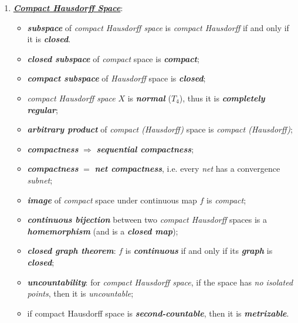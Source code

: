 \documentclass[11pt]{article}
\begin{document}
\begin{remark}
\begin{enumerate}
\item \underline{\emph{\textbf{Compact Hausdorff Space}}}:
\begin{itemize}
\item \emph{\textbf{subspace}} of \emph{compact Hausdorff space} is \emph{compact Hausdorff} if and only if it is \emph{\textbf{closed}}. 
\item \emph{\textbf{closed subspace}} of \emph{compact} space is \emph{\textbf{compact}}; 
\item \emph{\textbf{compact subspace}} of \emph{Hausdorff} space is \emph{\textbf{closed}};
\item \emph{compact Hausdorff space} $X$ is \textbf{\emph{normal}} ($T_4$), thus it is \emph{\textbf{completely regular}};
\item \emph{\textbf{arbitrary product}} of \emph{compact (Hausdorff)}  space is \emph{compact (Hausdorff)};
\item \emph{\textbf{compactness}} $\Rightarrow$ \emph{\textbf{sequential compactness}};
\item  \emph{\textbf{compactness}} $=$ \emph{\textbf{net compactness}}, i.e. every \emph{net} has a convergence \emph{subnet};
\item \emph{\textbf{image}} of \emph{compact} space under continuous map $f$ is \emph{compact};
\item \emph{\textbf{continuous bijection}} between two \emph{compact Hausdorff} spaces is a \emph{\textbf{homemorphism}} (and is a \emph{\textbf{closed map}});
\item \emph{\textbf{closed graph theorem}}: $f$ is \emph{\textbf{continuous}} if and only if its \emph{\textbf{graph}} is \emph{\textbf{closed}};
\item \emph{\textbf{uncountability}}: for \emph{compact Hausdorff space}, if the space has \emph{no isolated points}, then it is \emph{uncountable};
\item if compact Hausdorff space is \emph{\textbf{second-countable}}, then it is \emph{\textbf{metrizable}}.
\end{itemize}
\end{enumerate}
\end{remark}
\end{document}

